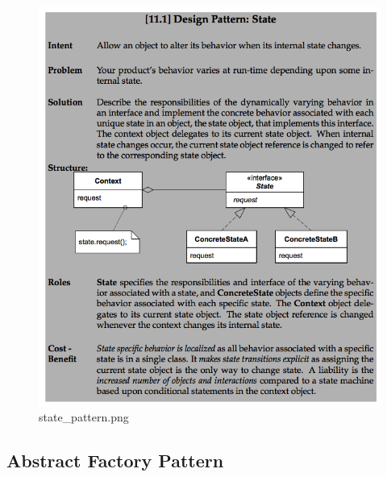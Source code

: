 \documentclass[11pt]{article}
\makeatletter
\def\maxwidth{\ifdim\Gin@nat@width>\linewidth\linewidth
    \else\Gin@nat@width\fi}
\let\Oldincludegraphics\includegraphics
\renewcommand{\includegraphics}[1]{\Oldincludegraphics[width=.8\maxwidth]{#1}}
\makeatother
\begin{document}
\begin{figure}
\centering
\includegraphics{img/state_pattern.png}
\caption{state\_pattern.png}
\end{figure}

\hypertarget{abstract-factory-pattern}{%
\subsection{Abstract Factory Pattern}\label{abstract-factory-pattern}}
\end{document}
